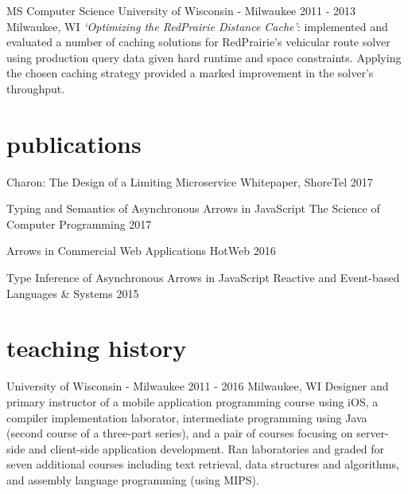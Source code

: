 \documentclass[]{clean-resume}
\begin{document}
\entry
  {MS Computer Science}
  {University of Wisconsin - Milwaukee}
  {2011 - 2013}
  {Milwaukee, WI}
  {
    \emph{`Optimizing the RedPrairie Distance Cache'}: implemented and evaluated a number of caching solutions for RedPrairie's vehicular route solver using production query data given hard runtime and space constraints. Applying the chosen caching strategy provided a marked improvement in the solver's throughput.
  }

\section{publications}

\shortentry
  {Charon: The Design of a Limiting Microservice}
  {Whitepaper, ShoreTel}
  {2017}

\shortentry
  {Typing and Semantics of Asynchronous Arrows in JavaScript}
  {The Science of Computer Programming}
  {2017}
  
\shortentry
  {Arrows in Commercial Web Applications}
  {HotWeb}
  {2016}
  
\shortentry
  {Type Inference of Asynchronous Arrows in JavaScript}
  {Reactive and Event-based Languages \& Systems}
  {2015}

\section{teaching history}

\entry
  {University of Wisconsin - Milwaukee}
  {}
  {2011 - 2016}
  {Milwaukee, WI}
  {
    Designer and primary instructor of a mobile application programming course using iOS, a compiler implementation laborator, intermediate programming using Java (second course of a three-part series), and a pair of courses focusing on server-side and client-side application development. Ran laboratories and graded for seven additional courses including text retrieval, data structures and algorithms, and assembly language programming (using MIPS).
  }
\end{document}

